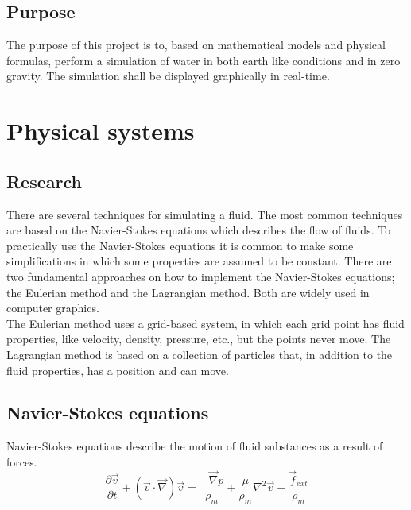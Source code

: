 \documentclass[a4paper,12pt,twoside,final]{report}
\begin{document}
\section{Purpose}
The purpose of this project is to, based on mathematical models and physical formulas, perform a simulation of water in both earth like conditions and in zero gravity. The simulation shall be displayed graphically in real-time.


\chapter{Physical systems}

\section{Research}
There are several techniques for simulating a fluid. The most common techniques are based on the Navier-Stokes equations which describes the flow of fluids. To practically use the Navier-Stokes equations it is common to make some simplifications in which some properties are assumed to be constant. There are two fundamental approaches on how to implement the Navier-Stokes equations; the Eulerian method and the Lagrangian method. Both are widely used in computer graphics. \\

\noindent The Eulerian method uses a grid-based system, in which each grid point has fluid properties, like velocity, density, pressure, etc., but the points never move.
The Lagrangian method is based on a collection of particles that, in addition to the fluid properties, has a position and can move.


\section{Navier-Stokes equations}

Navier-Stokes \cite{kelager06} equations describe the motion of fluid substances as a result of forces. \\

\begin{equation}
\frac{\partial \overrightarrow v}{\partial t} + ({\overrightarrow v}\cdot{\overrightarrow \nabla}){\overrightarrow v} = \frac{-\overrightarrow \nabla p}{\rho_m} + \frac{\mu}{\rho_m}{ \nabla^2}{\overrightarrow v} + \frac{\overrightarrow f_{ext}}{\rho_m}
\label{e1}
\end{equation}
\end{document}
